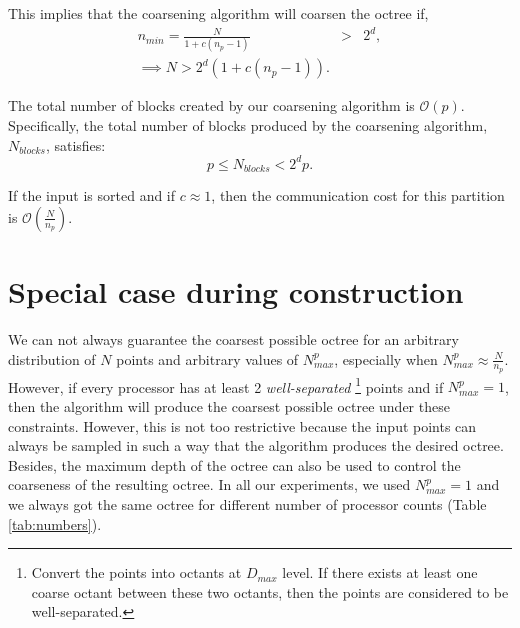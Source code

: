 This implies that the coarsening algorithm will coarsen the octree if,
\begin{eqnarray*}
n_{min} = \frac{N}{1+c(n_p-1)} & > & 2^d, \\
\implies N > 2^d(1 + c(n_p - 1)).
\end{eqnarray*}

The total number of blocks created by our coarsening algorithm is
$\mathcal{O}(p)$. Specifically, the total number of blocks produced by
the coarsening algorithm, $N_{blocks}$, satisfies:
\[
p \le N_{blocks} < 2^d p.
\]

If the input is sorted and if $c \approx 1$, then the communication
cost for this partition is $\mathcal{O}(\frac{N}{n_p})$.

\section{Special case during construction}
\label{app:specialCon}
We can not always guarantee the coarsest possible octree for an
arbitrary distribution of $N$ points and arbitrary values of
$N^p_{max}$, especially when $N^p_{max} \approx
\frac{N}{n_p}$. However, if every processor has at least 2
{\em{well-separated}} \footnote{Convert the points into octants at
$D_{max}$ level. If there exists at least one coarse octant between
these two octants, then the points are considered to be
well-separated.} points and if $N^p_{max}=1$, then the algorithm will
produce the coarsest possible octree under these constraints.
However, this is not too restrictive because the input points can
always be sampled in such a way that the algorithm produces the
desired octree. Besides, the maximum depth of the octree can also be
used to control the coarseness of the resulting octree. In all our
experiments, we used $N^p_{max}=1$ and we always got the same octree
for different number of processor counts (Table \ref{tab:numbers}).

